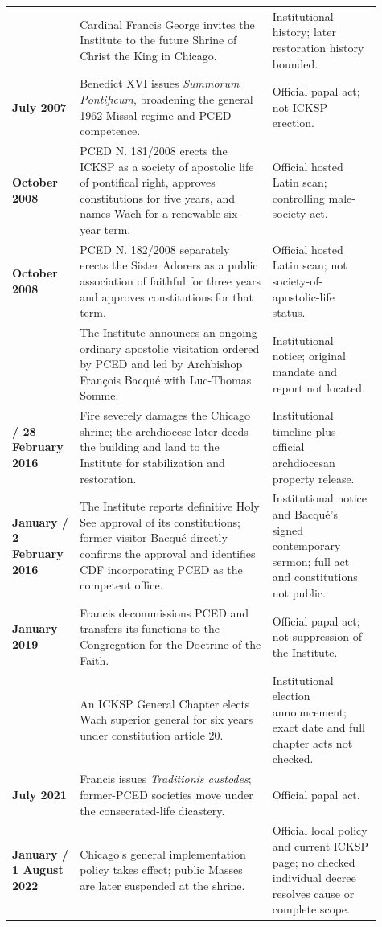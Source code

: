 \begin{longtable}{>{\bfseries\RaggedRight\arraybackslash}p{0.16\linewidth}>{\RaggedRight\arraybackslash}p{0.48\linewidth}>{\RaggedRight\arraybackslash}p{0.27\linewidth}}
2004 & Cardinal Francis George invites the Institute to the future Shrine of Christ the King in Chicago. & Institutional history; later restoration history bounded.\\
7 July 2007 & Benedict XVI issues \emph{Summorum Pontificum}, broadening the general 1962-Missal regime and PCED competence. & Official papal act; not ICKSP erection.\\
7 October 2008 & PCED N. 181/2008 erects the ICKSP as a society of apostolic life of pontifical right, approves constitutions for five years, and names Wach for a renewable six-year term. & Official hosted Latin scan; controlling male-society act.\\
7 October 2008 & PCED N. 182/2008 separately erects the Sister Adorers as a public association of faithful for three years and approves constitutions for that term. & Official hosted Latin scan; not society-of-apostolic-life status.\\
2014 & The Institute announces an ongoing ordinary apostolic visitation ordered by PCED and led by Archbishop François Bacqué with Luc-Thomas Somme. & Institutional notice; original mandate and report not located.\\
2015 / 28 February 2016 & Fire severely damages the Chicago shrine; the archdiocese later deeds the building and land to the Institute for stabilization and restoration. & Institutional timeline plus official archdiocesan property release.\\
29 January / 2 February 2016 & The Institute reports definitive Holy See approval of its constitutions; former visitor Bacqué directly confirms the approval and identifies CDF incorporating PCED as the competent office. & Institutional notice and Bacqué's signed contemporary sermon; full act and constitutions not public.\\
17 January 2019 & Francis decommissions PCED and transfers its functions to the Congregation for the Doctrine of the Faith. & Official papal act; not suppression of the Institute.\\
2020 & An ICKSP General Chapter elects Wach superior general for six years under constitution article 20. & Institutional election announcement; exact date and full chapter acts not checked.\\
16 July 2021 & Francis issues \emph{Traditionis custodes}; former-PCED societies move under the consecrated-life dicastery. & Official papal act.\\
25 January / 1 August 2022 & Chicago's general implementation policy takes effect; public Masses are later suspended at the shrine. & Official local policy and current ICKSP page; no checked individual decree resolves cause or complete scope.\\

\end{longtable}
